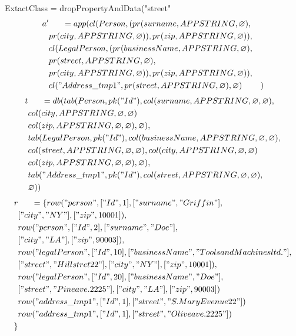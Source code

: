 \documentclass[11pt]{article}
\begin{document}
\newpage
ExtactClass = dropPropertyAndData("street"
\begin{align*}
a' & \;\;\;\;\;\; =app(cl(Person, (pr(surname, APPSTRING, \varnothing), \\
& pr(city, APPSTRING, \varnothing)), pr(zip, APPSTRING, \varnothing)), \\
& cl(LegalPerson, (pr(businessName, APPSTRING, \varnothing), \\
& pr(street, APPSTRING, \varnothing), \\
& pr(city, APPSTRING, \varnothing)), pr(zip, APPSTRING, \varnothing)), \\
& cl("Address\_tmp1", pr(street, APPSTRING, \varnothing) , \varnothing)
& )
\end{align*}
\begin{align*}
t & \;\;\;\;\;\; =db(tab(Person, pk("Id"), col(surname, APPSTRING, \varnothing, \varnothing), \\
& col(city, APPSTRING, \varnothing, \varnothing) \\
& col(zip, APPSTRING, \varnothing, \varnothing), \varnothing), \\
& tab(LegalPerson, pk("Id"),  col(businessName, APPSTRING, \varnothing, \varnothing), \\
& col(street, APPSTRING, \varnothing, \varnothing), col(city, APPSTRING, \varnothing, \varnothing) \\
& col(zip, APPSTRING, \varnothing, \varnothing), \varnothing), \\
& tab("Address\_tmp1", pk("Id"), col(street, APPSTRING, \varnothing, \varnothing),\\
& \varnothing)) 
\end{align*}
\begin{align*}
r & \;\;\;\;\;\; =\{ row("person", ["Id", 1], ["surname", "Griffin"], \\
& ["city", "NY"], ["zip", 10001]), \\
& row("person", ["Id", 2], ["surname", "Doe"], \\
& ["city", "LA"], ["zip", 90003]), \\
& row("legalPerson", ["Id", 10], ["businessName", "Tools and Machines ltd."], \\
& ["street", "Hill stret 22"], ["city", "NY"], ["zip", 10001]), \\
& row("legalPerson", ["Id", 20], ["businessName", "Doe"], \\
& ["street", "Pine ave. 2225"], ["city", "LA"], ["zip", 90003])\\
& row("address\_tmp1", ["Id", 1], ["street", "S. Mary Evenue 22"]) \\
& row("address\_tmp1", ["Id", 1], ["street", "Olive ave. 2225"] )\\
\}
\end{align*}
\end{document}
